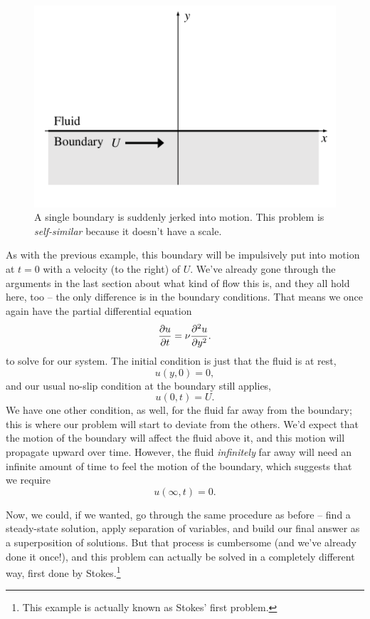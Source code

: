 \begin{figure}
\centering
\includegraphics[width=0.7\linewidth]{Figures/Chapter2/fig_self_sim_setup}
\caption{A single boundary is suddenly jerked into motion.  This problem is \emph{self-similar} because it doesn't have a scale.}
\label{fig_self_sim_setup}
\end{figure}

As with the previous example, this boundary will be impulsively put into motion at $t=0$ with a velocity (to the right) of $U$.  We've already gone through the arguments in the last section about what kind of flow this is, and they all hold here, too -- the only difference is in the boundary conditions.  That means we once again have the partial differential equation
\begin{equation}
\label{eq_ss_diffeq}
\frac{\partial {u}}{\partial {t}} = \nu \frac{\partial^2 {u}}{\partial {y}^2}.
\end{equation}
to solve for our system.  The initial condition is just that the fluid is at rest, 
\begin{equation}
u(y, 0) = 0,
\end{equation}
and our usual no-slip condition at the boundary still applies,
\begin{equation}
u(0, t) = U.
\end{equation}
We have one other condition, as well, for the fluid far away from the boundary; this is where our problem will start to deviate from the others.  We'd expect that the motion of the boundary will affect the fluid above it, and this motion will propagate upward over time.  However, the fluid \emph{infinitely} far away will need an infinite amount of time to feel the motion of the boundary, which suggests that we require
\begin{equation}
\label{eq_ss_bc2}
u(\infty, t) = 0.
\end{equation}

Now, we could, if we wanted, go through the same procedure as before -- find a steady-state solution, apply separation of variables, and build our final answer as a superposition of solutions.  But that process is cumbersome (and we've already done it once!), and this problem can actually be solved in a completely different way, first done by Stokes.\footnote{This example is actually known as Stokes' first problem.}

